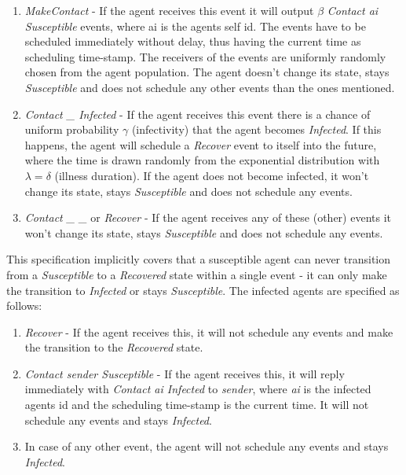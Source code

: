 \begin{enumerate}
	\item \textit{MakeContact} - If the agent receives this event it will output $\beta$  \textit{Contact ai Susceptible} events, where ai is the agents self id. The events have to be scheduled immediately without delay, thus having the current time as scheduling time-stamp. The receivers of the events are uniformly randomly chosen from the agent population. The agent doesn't change its state, stays \textit{Susceptible} and does not schedule any other events than the ones mentioned.
	
	\item \textit{Contact \_ Infected} - If the agent receives this event there is a chance of uniform probability $\gamma$ (infectivity) that the agent becomes \textit{Infected}. If this happens, the agent will schedule a \textit{Recover} event to itself into the future, where the time is drawn randomly from the exponential distribution with $\lambda = \delta$ (illness duration). If the agent does not become infected, it won't change its state, stays \textit{Susceptible} and does not schedule any events.
	
	\item \textit{Contact \_ \_} or \textit{Recover} - If the agent receives any of these (other) events it won't change its state, stays \textit{Susceptible} and does not schedule any events.
\end{enumerate}

This specification implicitly covers that a susceptible agent can never transition from a \textit{Susceptible} to a \textit{Recovered} state within a single event - it can only make the transition to \textit{Infected} or stays \textit{Susceptible}. The infected agents are specified as follows:

\begin{enumerate}
	\item \textit{Recover} - If the agent receives this, it will not schedule any events and make the transition to the \textit{Recovered} state.
	
	\item \textit{Contact sender Susceptible} - If the agent receives this, it will reply immediately with \textit{Contact ai Infected} to \textit{sender}, where \textit{ai} is the infected agents id and the scheduling time-stamp is the current time. It will not schedule any events and stays \textit{Infected}.
	
	\item In case of any other event, the agent will not schedule any events and stays \textit{Infected}.
\end{enumerate}

